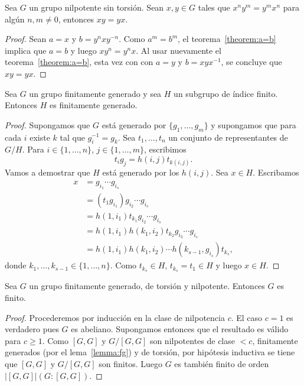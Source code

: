 \begin{corollary}
	Sea $G$ un grupo nilpotente sin torsión. Sean $x,y\in G$ tales que
	$x^ny^m=y^mx^n$ para algún $n,m\ne 0$, entonces $xy=yx$.
\end{corollary}

\begin{proof}
	Sean $a=x$ y $b=y^nxy^{-n}$. Como $a^m=b^m$, el teorema~\ref{theorem:a=b}
	implica que $a=b$ y luego $xy^n=y^nx$. Al usar nuevamente el
	teorema~\ref{theorem:a=b}, esta vez con con $a=y$ y $b=xyx^{-1}$, se
	concluye que $xy=yx$. 
\end{proof}

\begin{lemma}
	\label{lemma:fg}
	Sea $G$ un grupo finitamente generado y sea $H$ un subgrupo de índice
	finito. Entonces $H$ es finitamente generado.
\end{lemma}

\begin{proof}
	Supongamos que $G$ está generado por $\{g_1,\dots,g_m\}$ y supongamos que
	para cada $i$ existe $k$ tal que $g_i^{-1}=g_k$. Sea $t_1,\dots,t_n$ un
	conjunto de representantes de $G/H$. Para $i\in\{1,\dots,n\}$,
	$j\in\{1,\dots,m\}$, escribimos
	\[
		t_ig_j=h(i,j)t_{k(i,j)}.
	\]
	Vamos a demostrar que $H$ está generado por los $h(i,j)$. Sea $x\in H$.
	Escribamos 
	\begin{align*}
	x &=g_{i_1}\cdots g_{i_s}\\
	&= (t_1g_{i_1})g_{i_2}\cdots g_{i_s}\\
	&= h(1,i_1)t_{k_1}g_{i_2}\cdots g_{i_s}\\
	&= h(1,i_1)h(k_1,i_2)t_{k_2}g_{i_3}\cdots g_{i_s}\\
	&= h(1,i_1)h(k_1,i_2)\cdots h(k_{s-1},g_{i_s})t_{k_s},
	\end{align*}
	donde $k_1,\dots,k_{s-1}\in\{1,\dots,n\}$. Como $t_{k_s}\in H$,
	$t_{k_s}=t_1\in H$ y luego $x\in H$.
\end{proof}

\begin{theorem}
	\label{theorem:T(G)finito}
	Sea $G$ un grupo finitamente generado, de torsión y nilpotente. Entonces
	$G$ es finito. 	
\end{theorem}

\begin{proof}
	Procederemos por inducción en la clase de nilpotencia $c$. El caso $c=1$ es
	verdadero pues $G$ es abeliano. Supongamos entonces que el resultado es
	válido para $c\geq1$.  Como $[G,G]$ y $G/[G,G]$ son nilpotentes de clase
	$<c$, finitamente generados (por el lema~\ref{lemma:fg}) y de torsión, por
	hipótesis inductiva se tiene que $[G,G]$ y $G/[G,G]$ son finitos. Luego $G$
	es también finito de orden $|[G,G]|(G:[G,G])$.
\end{proof}

